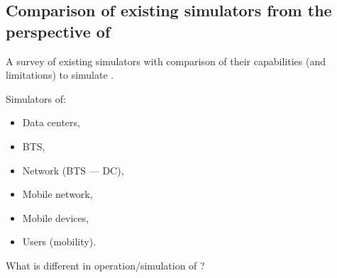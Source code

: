 \subsection{Comparison of existing simulators from the perspective of \xcloud}
A survey of existing simulators with comparison of their capabilities (and limitations) to simulate \xcloud.

Simulators of:
\begin{itemize}
\item Data centers,
\item BTS,
\item Network (BTS --- DC),
\item Mobile network,
\item Mobile devices,
\item Users (mobility).
\end{itemize}

What is different in operation/simulation of \xcloud?
